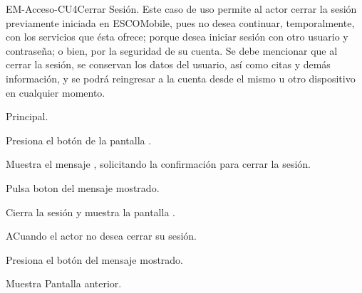 
	\begin{UseCase}{EM-Acceso-CU4}{Cerrar Sesión.}{
		\noindent
		Este caso de uso permite al actor cerrar la sesión previamente iniciada en ESCOMobile, pues no desea
		continuar, temporalmente, con los servicios que ésta ofrece; porque desea iniciar sesión con otro usuario
		y contraseña; o bien, por la seguridad de su cuenta. Se debe mencionar que al cerrar la sesión, se conservan
		los datos del usuario, así como citas y demás información, y se podrá reingresar a la cuenta desde el mismo
		u otro dispositivo en cualquier momento. 
		\newline
		}
	\end{UseCase}

	\begin{UCtrayectoria}{Principal.}

		\UCpaso[\UCactor] Presiona el botón  de la pantalla .

		\UCpaso Muestra el mensaje , solicitando la confirmación para cerrar la sesión.

		\UCpaso [\UCactor] Pulsa boton  del mensaje mostrado. 

		\UCpaso Cierra la sesión y muestra la pantalla .

	\end{UCtrayectoria}

	\begin{UCtrayectoriaA}{A}{Cuando el actor no desea cerrar su sesión.}

		\UCpaso	Presiona el botón  del mensaje mostrado.

		\UCpaso Muestra Pantalla anterior.

	\end{UCtrayectoriaA}
